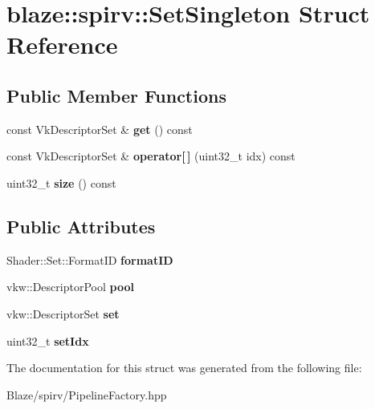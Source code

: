 \hypertarget{structblaze_1_1spirv_1_1SetSingleton}{}\section{blaze\+:\+:spirv\+:\+:Set\+Singleton Struct Reference}
\label{structblaze_1_1spirv_1_1SetSingleton}
\subsection*{Public Member Functions}
\begin{DoxyCompactItemize}
\item 
\mbox{\label{structblaze_1_1spirv_1_1SetSingleton_a1ce2da44b2eef618d2e4a342cf4c4f52}} 
const Vk\+Descriptor\+Set \& {\bfseries get} () const
\item 
\mbox{\label{structblaze_1_1spirv_1_1SetSingleton_a7767b199db5f71b8d81d7ffda56c2986}} 
const Vk\+Descriptor\+Set \& {\bfseries operator\mbox{[}$\,$\mbox{]}} (uint32\+\_\+t idx) const
\item 
\mbox{\label{structblaze_1_1spirv_1_1SetSingleton_a56f29d08d24035df16ef6ad91bdffa1e}} 
uint32\+\_\+t {\bfseries size} () const
\end{DoxyCompactItemize}
\subsection*{Public Attributes}
\begin{DoxyCompactItemize}
\item 
\mbox{\label{structblaze_1_1spirv_1_1SetSingleton_a871ca54ecaaf9bf7111880af9673b8a8}} 
Shader\+::\+Set\+::\+Format\+ID {\bfseries format\+ID}
\item 
\mbox{\label{structblaze_1_1spirv_1_1SetSingleton_ae93988e6c27120dcbe6da5daae6e4ee8}} 
vkw\+::\+Descriptor\+Pool {\bfseries pool}
\item 
\mbox{\label{structblaze_1_1spirv_1_1SetSingleton_a97d2c3727ca183de0127c34b761b57a4}} 
vkw\+::\+Descriptor\+Set {\bfseries set}
\item 
\mbox{\label{structblaze_1_1spirv_1_1SetSingleton_a5bc6c54fd40b83c451ca06235189524e}} 
uint32\+\_\+t {\bfseries set\+Idx}
\end{DoxyCompactItemize}


The documentation for this struct was generated from the following file\+:\begin{DoxyCompactItemize}
\item 
Blaze/spirv/Pipeline\+Factory.\+hpp\end{DoxyCompactItemize}
